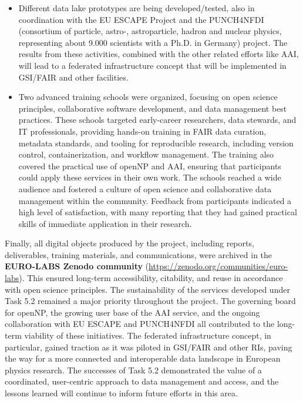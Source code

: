 \begin{itemize}
  \item Different data lake prototypes are being developed/tested, also in coordination with the EU ESCAPE Project and the PUNCH4NFDI (consortium of particle, astro-, astroparticle, hadron and nuclear physics, representing about 9.000 scientists with a Ph.D. in Germany) project. The results from these activities, combined with the other related efforts like AAI, will lead to a federated infrastructure concept that will be implemented in GSI/FAIR and other facilities. 
  \item Two advanced training schools were organized, focusing on open science principles, collaborative software development, and data management best practices. These schools targeted early-career researchers, data stewards, and IT professionals, providing hands-on training in FAIR data curation, metadata standards, and tooling for reproducible research, including version control, containerization, and workflow management. The training also covered the practical use of openNP and AAI, ensuring that participants could apply these services in their own work. The schools reached a wide audience and fostered a culture of open science and collaborative data management within the community. Feedback from participants indicated a high level of satisfaction, with many reporting that they had gained practical skills
  of immediate application in their research.
\end{itemize}
     


Finally, all digital objects produced by the project, including reports, deliverables, training materials, and communications, were archived in the \textbf{EURO-LABS Zenodo community} (\url{https://zenodo.org/communities/euro-labs}). This ensured long-term accessibility, citability, and reuse in accordance with open science principles. The sustainability of the services developed under Task 5.2 remained a major priority throughout the project. The governing board for openNP, the growing user base of the AAI service, and the ongoing collaboration with EU ESCAPE and PUNCH4NFDI all contributed to the long-term viability of these initiatives. The federated infrastructure concept, in particular, gained traction as it was piloted in GSI/FAIR and other RIs, paving the way for a more connected and interoperable data landscape in European physics research. The successes of Task 5.2 demonstrated the value of a coordinated, user-centric approach to data management and access, and the lessons learned will continue to inform future efforts in this area.


